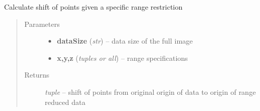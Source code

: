 \documentclass[letterpaper,10pt,english]{sphinxmanual}
\begin{document}

\begin{fulllineitems}
\label{api/ClearMap.IO:ClearMap.IO.IO.pointShiftFromRange}
Calculate shift of points given a specific range restriction
\begin{quote}\begin{description}
\item[{Parameters}] \leavevmode\begin{itemize}
\item {} 
\textbf{dataSize} (\emph{str}) --
data size of the full image

\item {} 
\textbf{x,y,z} (\emph{tuples or all}) --
range specifications

\end{itemize}

\item[{Returns}] \leavevmode
\emph{tuple} --
shift of points from original origin of data to origin of range reduced data

\end{description}\end{quote}

\end{fulllineitems}

\end{document}
